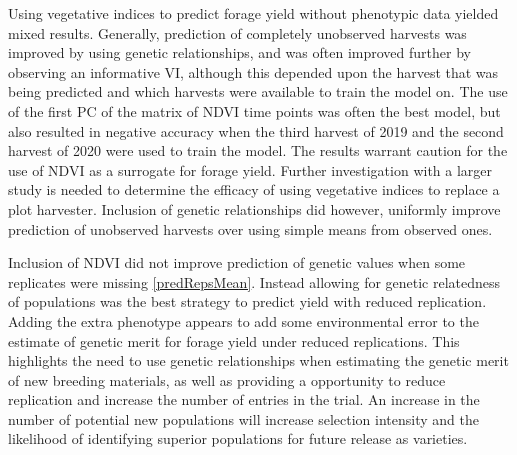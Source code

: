 \documentclass[12pt, letterpaper]{article}
\begin{document}
Using vegetative indices to predict forage yield without phenotypic data yielded mixed results. Generally, prediction of completely unobserved harvests was improved by using genetic relationships, and was often improved further by observing an informative VI, although this depended upon the harvest that was being predicted and which harvests were available to train the model on. The use of the first PC of the matrix of NDVI time points was often the best model, but also resulted in negative accuracy when the third harvest of 2019 and the second harvest of 2020 were used to train the model. The results warrant caution for the use of NDVI as a surrogate for forage yield. Further investigation with a larger study is needed to determine the efficacy of using vegetative indices to replace a plot harvester. Inclusion of genetic relationships did however, uniformly improve prediction of unobserved harvests over using simple means from observed ones. 

Inclusion of NDVI did not improve prediction of genetic values when some replicates were missing \ref{predRepsMean}. Instead allowing for genetic relatedness of populations was the best strategy to predict yield with reduced replication. Adding the extra phenotype appears to add some environmental error to the estimate of genetic merit for forage yield under reduced replications. This highlights the need to use genetic relationships when estimating the genetic merit of new breeding materials, as well as providing a opportunity to reduce replication and increase the number of entries in the trial. An increase in the number of potential new populations will increase selection intensity and the likelihood of identifying superior populations for future release as varieties.


\end{document}
